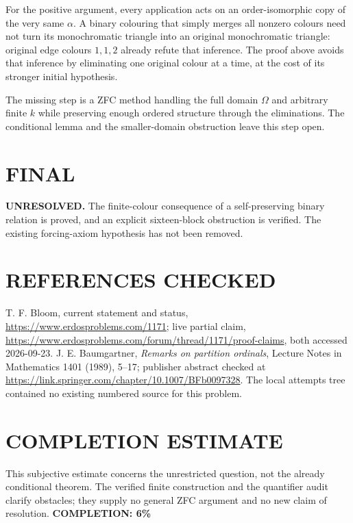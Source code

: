 For the positive argument, every application acts on an order-isomorphic copy of the very same $\alpha$. A binary colouring that simply merges all nonzero colours need not turn its monochromatic triangle into an original monochromatic triangle: original edge colours $1,1,2$ already refute that inference. The proof above avoids that inference by eliminating one original colour at a time, at the cost of its stronger initial hypothesis.

The missing step is a ZFC method handling the full domain $\Omega$ and arbitrary finite $k$ while preserving enough ordered structure through the eliminations. The conditional lemma and the smaller-domain obstruction leave this step open.

\section{FINAL}
\textbf{UNRESOLVED.} The finite-colour consequence of a self-preserving binary relation is proved, and an explicit sixteen-block obstruction is verified. The existing forcing-axiom hypothesis has not been removed.

\section{REFERENCES CHECKED}
T. F. Bloom, current statement and status, \url{https://www.erdosproblems.com/1171}; live partial claim, \url{https://www.erdosproblems.com/forum/thread/1171/proof-claims}, both accessed 2026-09-23. J. E. Baumgartner, \emph{Remarks on partition ordinals}, Lecture Notes in Mathematics 1401 (1989), 5--17; publisher abstract checked at \url{https://link.springer.com/chapter/10.1007/BFb0097328}. The local attempts tree contained no existing numbered source for this problem.

\section{COMPLETION ESTIMATE}
This subjective estimate concerns the unrestricted question, not the already conditional theorem. The verified finite construction and the quantifier audit clarify obstacles; they supply no general ZFC argument and no new claim of resolution.
\textbf{COMPLETION: 6\%}
